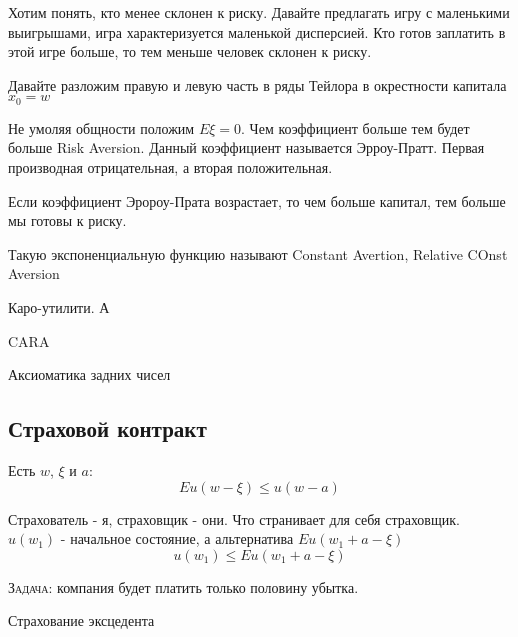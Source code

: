 \documentclass[%
12pt, %
final, %
oneside, %
onecolumn, %
centertags]{article} %
\theoremstyle{plain}
\theoremstyle{definition}
\theoremstyle{remark}
\begin{document}
Хотим понять, кто менее склонен к риску. Давайте предлагать игру с маленькими выигрышами, игра характеризуется маленькой дисперсией. Кто готов заплатить в этой игре больше, то тем меньше человек склонен к риску.

Давайте разложим правую и левую часть в ряды Тейлора в окрестности капитала $x_0 = w$

Не умоляя общности положим $E\xi = 0$. Чем коэффициент больше тем будет больше Risk Aversion. Данный коэффициент называется Эрроу-Пратт. Первая производная отрицательная, а вторая положительная.

Если коэффициент Эророу-Прата возрастает, то чем больше капитал, тем больше мы готовы к риску.

Такую экспоненциальную функцию называют Constant Avertion, Relative COnst Aversion

Каро-утилити. А

CARA

Аксиоматика задних чисел

\subsection{Страховой контракт}

Есть $w$, $\xi$ и $a$:
$$Eu(w-\xi) \leqslant u(w-a)$$

Страхователь - я, страховщик - они. Что странивает для себя страховщик. $u(w_1)$ - начальное состояние, а альтернатива $Eu(w_1+a-\xi)$
$$u(w_1) \leqslant Eu(w_1+a-\xi)$$

\textsc{Задача:} компания будет платить только половину убытка.

Страхование эксцедента 
\end{document}
